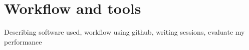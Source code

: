 \chapter{Workflow and tools}\label{chp:tools}
Describing software used, workflow using github, writing sessions, evaluate my performance
